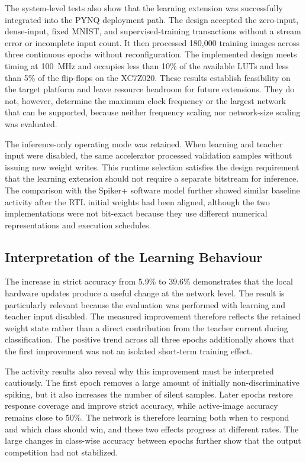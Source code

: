 The system-level tests also show that the learning extension was successfully integrated into the PYNQ deployment path. The design accepted the zero-input, dense-input, fixed MNIST, and supervised-training transactions without a stream error or incomplete input count. It then processed 180,000 training images across three continuous epochs without reconfiguration. The implemented design meets timing at 100~MHz and occupies less than 10\% of the available LUTs and less than 5\% of the flip-flops on the XC7Z020. These results establish feasibility on the target platform and leave resource headroom for future extensions. They do not, however, determine the maximum clock frequency or the largest network that can be supported, because neither frequency scaling nor network-size scaling was evaluated.

The inference-only operating mode was retained. When learning and teacher input were disabled, the same accelerator processed validation samples without issuing new weight writes. This runtime selection satisfies the design requirement that the learning extension should not require a separate bitstream for inference. The comparison with the Spiker+ software model further showed similar baseline activity after the RTL initial weights had been aligned, although the two implementations were not bit-exact because they use different numerical representations and execution schedules.

\subsection{Interpretation of the Learning Behaviour}

The increase in strict accuracy from 5.9\% to 39.6\% demonstrates that the local hardware updates produce a useful change at the network level. The result is particularly relevant because the evaluation was performed with learning and teacher input disabled. The measured improvement therefore reflects the retained weight state rather than a direct contribution from the teacher current during classification. The positive trend across all three epochs additionally shows that the first improvement was not an isolated short-term training effect.

The activity results also reveal why this improvement must be interpreted cautiously. The first epoch removes a large amount of initially non-discriminative spiking, but it also increases the number of silent samples. Later epochs restore response coverage and improve strict accuracy, while active-image accuracy remains close to 50\%. The network is therefore learning both when to respond and which class should win, and these two effects progress at different rates. The large changes in class-wise accuracy between epochs further show that the output competition had not stabilized.


